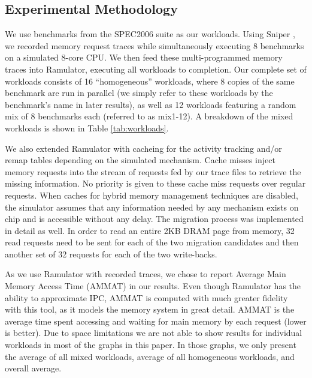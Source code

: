 \subsection{Experimental Methodology}
\label{sub:Experimental}

We use benchmarks from the SPEC2006 suite \cite{spec} as our workloads. Using Sniper \cite{sniper}, we recorded memory request traces while simultaneously executing 8 benchmarks on a simulated 8-core CPU. We then feed these multi-programmed memory traces into Ramulator, executing all workloads to completion. Our complete set of workloads consists of 16 ``homogeneous'' workloads, where 8 copies of the same benchmark are run in parallel (we simply refer to these workloads by the benchmark's name in later results), as well as 12 workloads featuring a random mix of 8 benchmarks each (referred to as mix1-12). A breakdown of the mixed workloads is shown in Table \ref{tab:workloads}.


We also extended Ramulator with cacheing for the activity tracking and/or remap tables depending on the simulated mechanism. Cache misses inject memory requests into the stream of requests fed by our trace files to retrieve the missing information. No priority is given to these cache miss requests over regular requests. When caches for hybrid memory management techniques are disabled, the simulator assumes that any information needed by any mechanism exists on chip and is accessible without any delay. The migration process was implemented in detail as well. In order to read an entire 2KB DRAM page from memory, 32 read requests need to be sent for each of the two migration candidates and then another set of 32 requests for each of the two write-backs.


As we use Ramulator with recorded traces, we chose to report Average Main Memory Access Time (AMMAT) in our results. Even though Ramulator has the ability to approximate IPC, AMMAT is computed with much greater fidelity with this tool,
as it models the memory system in great detail. AMMAT is the average time 
spent accessing and waiting for main memory by each request (lower is better). Due to space limitations we are not able to show results for individual workloads in most of the graphs in this paper. In those graphs, we only present the average of all mixed workloads, average of all homogeneous workloads, and overall average.

